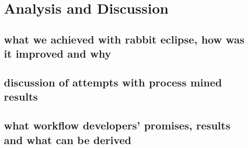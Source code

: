 \chapter{Analysis and Discussion }\label{cha:AnalysisAndDiscusion}
\section{what we achieved with rabbit eclipse, how was it improved and why}
\section{discussion of attempts with process mined results}
\section{what workflow developers' promises, results and what can be derived}
